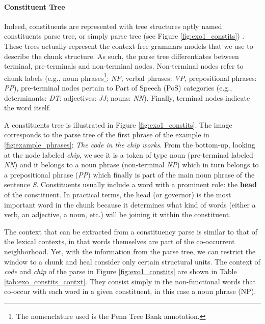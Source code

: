 \paragraph{Constituent Tree}
Indeed, constituents are  represented with tree structures aptly named  constituents parse tree, or simply parse tree (see Figure \ref{fig:exo1_constits}) \cite{JurafskyM09}. These trees actually represent the context-free grammars models that we use to describe the chunk structure. As such, the parse tree differentiates between terminal, pre-terminals and non-terminal nodes. Non-terminal nodes refer to chunk labels (e.g., noun phrases\footnote{The nomenclature used is the Penn Tree Bank annotation.}: \textit{NP}, verbal phrases: \textit{VP}, prepositional phrases: \textit{PP}), pre-terminal nodes pertain to Part of Speech (PoS) categories (e.g., determinants: \textit{DT}; adjectives: \textit{JJ}; nouns: \textit{NN}). Finally, terminal nodes indicate the word itself. 

A constituents tree is illustrated in Figure \ref{fig:exo1_constits}. The image corresponds to the parse tree of the first phrase of the example in \ref{fig:example_phrases}: \textit{The code in the chip works}. From the bottom-up,  looking at the node labeled \textit{chip}, we see it is a token of type noun (pre-terminal labeled \textit{NN}) and it belongs to a noun phrase (non-terminal \textit{NP}) which in turn belongs to a prepositional phrase (\textit{PP}) which finally is part of the main noun phrase of the sentence \textit{S}. Constituents usually include a word with a prominent role: the \textbf{head} of the constituent. In practical terms, the head (or governor) is the most important word in the chunk because it determines what kind of words (either a verb, an adjective, a noun, etc.) will be joining it within the constituent. 

The context that can be extracted from a constituency parse is similar to that of the lexical contexts, in that words themselves are part of the co-occurrent neighborhood. Yet, with the information from the parse tree, we can restrict the window to a chunk and heal consider only certain structural units. The context of \textit{code} and \textit{chip} of the parse  in Figure \ref{fig:exo1_constits} are shown in Table \ref{tab:exo_constits_contxt}. They consist simply in the non-functional words that co-occur with each word in a given constituent, in this case a noun phrase (NP).

